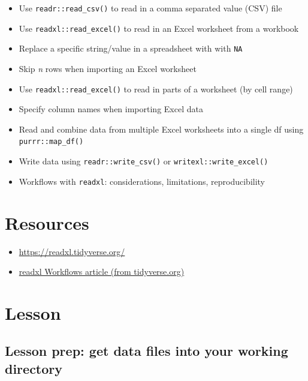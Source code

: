 \documentclass[]{book}
\providecommand{\tightlist}{%
  \setlength{\itemsep}{0pt}\setlength{\parskip}{0pt}}
\begin{document}
\begin{itemize}
\tightlist
\item
  Use \texttt{readr::read\_csv()} to read in a comma separated value (CSV) file
\item
  Use \texttt{readxl::read\_excel()} to read in an Excel worksheet from a workbook
\item
  Replace a specific string/value in a spreadsheet with with \texttt{NA}
\item
  Skip \emph{n} rows when importing an Excel worksheet
\item
  Use \texttt{readxl::read\_excel()} to read in parts of a worksheet (by cell range)
\item
  Specify column names when importing Excel data
\item
  Read and combine data from multiple Excel worksheets into a single df using \texttt{purrr::map\_df()}
\item
  Write data using \texttt{readr::write\_csv()} or \texttt{writexl::write\_excel()}
\item
  Workflows with \texttt{readxl}: considerations, limitations, reproducibility
\end{itemize}

\hypertarget{resources-1}{%
\section{Resources}\label{resources-1}}

\begin{itemize}
\tightlist
\item
  \url{https://readxl.tidyverse.org/}
\item
  \href{https://readxl.tidyverse.org/articles/articles/readxl-workflows.html}{readxl Workflows article (from tidyverse.org)}
\end{itemize}

\hypertarget{lesson}{%
\section{Lesson}\label{lesson}}

\hypertarget{lesson-prep-get-data-files-into-your-working-directory}{%
\subsection{Lesson prep: get data files into your working directory}\label{lesson-prep-get-data-files-into-your-working-directory}}
\end{document}

